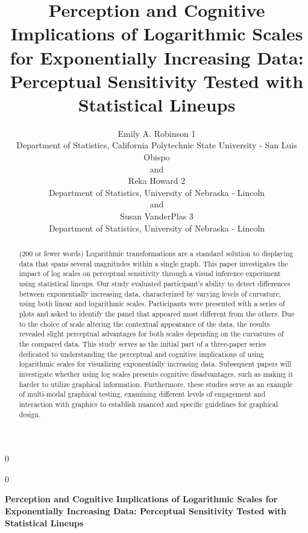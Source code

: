 \documentclass[12pt]{article}
\newcommand{\blind}{0}
\begin{document}
\def\spacingset#1{\renewcommand{\baselinestretch}%
{#1}\small\normalsize} \spacingset{1}



\blind
{
  \title{\bf Perception and Cognitive Implications of Logarithmic Scales
for Exponentially Increasing Data: Perceptual Sensitivity Tested with
Statistical Lineups}

  \author{
        Emily A. Robinson 1 \\
    Department of Statistics, California Polytechnic State University -
San Luis Obispo\\
     and \\     Reka Howard 2 \\
    Department of Statistics, University of Nebraska - Lincoln\\
     and \\     Susan VanderPlas 3 \\
    Department of Statistics, University of Nebraska - Lincoln\\
      }
  \maketitle
} \fi

\blind
{
  \bigskip
  \bigskip
  \bigskip
  \begin{center}
    {\LARGE\bf Perception and Cognitive Implications of Logarithmic
Scales for Exponentially Increasing Data: Perceptual Sensitivity Tested
with Statistical Lineups}
  \end{center}
  \medskip
} \fi

\bigskip
\begin{abstract}
(200 or fewer words) Logarithmic transformations are a standard solution
to displaying data that spans several magnitudes within a single graph.
This paper investigates the impact of log scales on perceptual
sensitivity through a visual inference experiment using statistical
lineups. Our study evaluated participant's ability to detect differences
between exponentially increasing data, characterized by varying levels
of curvature, using both linear and logarithmic scales. Participants
were presented with a series of plots and asked to identify the panel
that appeared most different from the others. Due to the choice of scale
altering the contextual appearance of the data, the results revealed
slight perceptual advantages for both scales depending on the curvatures
of the compared data. This study serves as the initial part of a
three-paper series dedicated to understanding the perceptual and
cognitive implications of using logarithmic scales for visualizing
exponentially increasing data. Subsequent papers will investigate
whether using log scales presents cognitive disadvantages, such as
making it harder to utilize graphical information. Furthermore, these
studies serve as an example of multi-modal graphical testing, examining
different levels of engagement and interaction with graphics to
establish nuanced and specific guidelines for graphical design.
\end{abstract}
\end{document}
